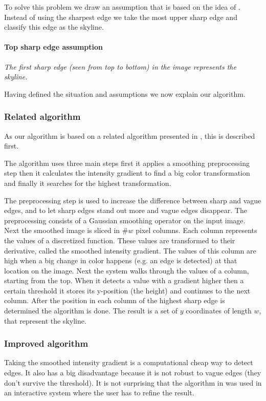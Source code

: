 To solve this problem we draw an assumption that is based on the
idea of \cite{Rover}. Instead of using the sharpest edge we take the most upper sharp
edge and classify this edge as the skyline.\\

\paragraph{Top sharp edge assumption}
\emph{The first sharp edge (seen from top to bottom) in the image 
represents the skyline.}

Having defined the situation and assumptions we now explain our algorithm.

\subsubsection{Related algorithm}
As our algorithm is based on a related algorithm presented in \cite{Rover},
this is described first.


The algorithm uses three main steps first it applies a smoothing preprocessing
step then it calculates the intensity gradient to find a big color transformation
and finally it searches for the highest transformation.

The preprocessing step is used to increase the difference between sharp and
vague edges, and to let sharp edges stand out more and vague edges disappear.
The preprocessing consists of a Gaussian smoothing operator on the input image.
Next the smoothed image is sliced in \#$w$ pixel columns. Each column represents
the values of a discretized function. These values are transformed to their
derivative, called the smoothed intensity gradient. The values
of this column are high when a big change in color happens (e.g. an edge is
detected) at that location on the image. Next the system walks through the
values of a column, starting from the top. When it detects a value with a
gradient higher then a certain threshold it stores its y-position (the height)
and continues to the next column. After the position in each column of the
highest sharp edge is determined the algorithm is done. The result is a set of
$y$ coordinates of length $w$, that represent the skyline. 

\subsubsection{Improved algorithm}
Taking the smoothed intensity gradient is a computational cheap way to
detect edges. It also has a big disadvantage because it is not robust to vague edges
(they don't survive the threshold). It is not surprising that the algorithm in \cite{Rover}
was used in an interactive system where the user has to refine the result.\\

